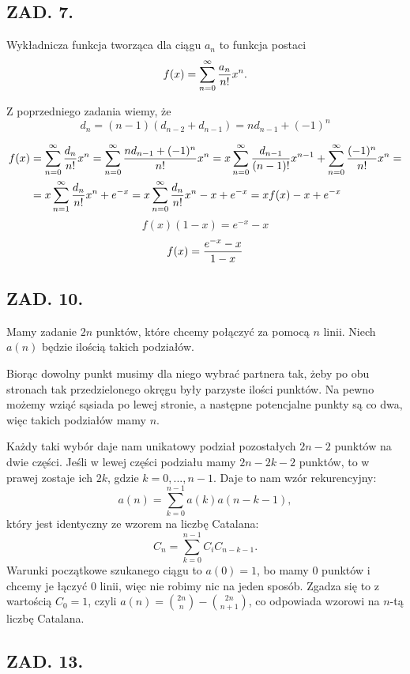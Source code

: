 \documentclass{article}[13pt]
\begin{document}
\subsection*{ZAD. 7.}

Wykładnicza funkcja tworząca dla ciągu $a_n$ to funkcja postaci
$$f(x)=\sum\limits_{n=0}^\infty {a_n\over n!}x^n.$$

Z poprzedniego zadania wiemy, że
$$d_{n}=(n-1)(d_{n-2}+d_{n-1})=nd_{n-1}+(-1)^n$$

\begin{align*}
    f(x)&=\sum\limits_{n=0}^\infty {d_n\over n!}x^n=\sum\limits_{n=0}^\infty {nd_{n-1}+(-1)^n\over n!}x^n=x\sum\limits_{n=0}^\infty {d_{n-1}\over (n-1)!}x^{n-1}+\sum\limits_{n=0}^\infty {(-1)^n\over n!}x^n=\\
    &=x\sum\limits_{n=1}^\infty {d_n\over n!}x^n+e^{-x}=x\sum\limits_{n=0}^\infty {d_n\over n!}x^n-x+e^{-x}=xf(x)-x+e^{-x}\\
\end{align*}
$$f(x)(1-x)=e^{-x}-x$$
$$f(x)={e^{-x}-x\over 1-x}$$

\subsection*{ZAD. 10.}

Mamy zadanie $2n$ punktów, które chcemy połączyć za pomocą $n$ linii. Niech $a(n)$ będzie ilością takich podziałów. 

Biorąc dowolny punkt musimy dla niego wybrać partnera tak, żeby po obu stronach tak przedzielonego okręgu były parzyste ilości punktów. Na pewno możemy wziąć sąsiada po lewej stronie, a następne potencjalne punkty są co dwa, więc takich podziałów mamy $n$. 

Każdy taki wybór daje nam unikatowy podział pozostałych $2n-2$ punktów na dwie części. Jeśli w lewej części podziału mamy $2n-2k-2$ punktów, to w prawej zostaje ich $2k$, gdzie $k=0,...,n-1$. Daje to nam wzór rekurencyjny:
$$a(n)=\sum\limits_{k=0}^{n-1}a(k)a(n-k-1),$$
który jest identyczny ze wzorem na liczbę Catalana:
$$C_n=\sum\limits_{k=0}^{n-1}C_iC_{n-k-1}.$$
Warunki początkowe szukanego ciągu to $a(0)=1$, bo mamy $0$ punktów i chcemy je łączyć $0$ linii, więc nie robimy nic na jeden sposób. Zgadza się to z wartością $C_0=1$, czyli $a(n)={2n\choose n}-{2n\choose n+1}$, co odpowiada wzorowi na $n$-tą liczbę Catalana.

\subsection*{ZAD. 13.}
\end{document}
